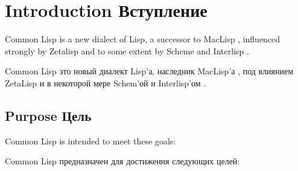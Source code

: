 


\clearpage\def\pagestatus{FINAL PROOF}
\chapter{Introduction Вступление}

Common Lisp is a new dialect of Lisp, a
successor to MacLisp \cite{MOONUAL,PITMANUAL}, influenced strongly by
Zetalisp \cite{BLUE-LISPM,GREEN-LISPM} and to some extent by Scheme
\cite{SCHEME-REVISED-REPORT} and Interlisp \cite{INTERLISP}.

Common Lisp это новый диалект Lisp'а, наследник
MacLisp'а \cite{MOONUAL,PITMANUAL}, под влиянием
ZetaLisp \cite{BLUE-LISPM,GREEN-LISPM} и в некоторой мере
Schem'ой \cite{SCHEME-REVISED-REPORT} и Interlisp'ом \cite{INTERLISP}.

\section{Purpose Цель}

Common Lisp is intended to meet these goals:

Common Lisp предназначен для достижения следующих целей: 

